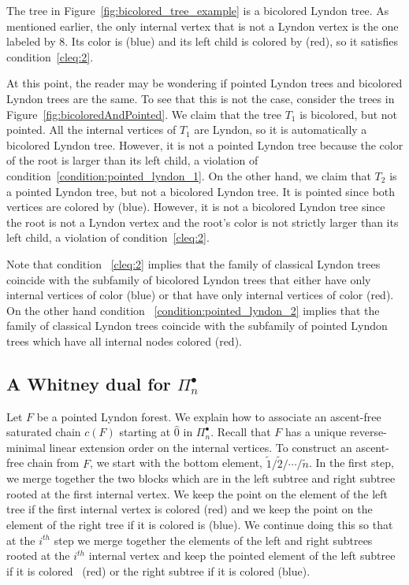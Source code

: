 The tree in Figure~\ref{fig:bicolored_tree_example} is a bicolored Lyndon tree.  As mentioned earlier, the only internal vertex that is not a Lyndon vertex is the one labeled by 8.   Its color is  (blue) and its left child is colored by  (red), so it satisfies condition~\eqref{cleq:2}.  

At this point, the reader may be wondering if pointed Lyndon trees and bicolored Lyndon trees are the same.  To see that this is not the case, consider the trees in Figure~\ref{fig:bicoloredAndPointed}.  We claim that the tree $T_1$ is bicolored, but not pointed.  All the internal vertices of $T_1$ are Lyndon, so it is automatically a bicolored Lyndon tree.  However,  it is not a pointed Lyndon tree because the color of the root is larger than its left child, a violation of condition~\eqref{condition:pointed_lyndon_1}.  On the other hand, we claim that $T_2$ is a pointed Lyndon tree, but not a bicolored Lyndon tree.  It is pointed  since both vertices are colored by  (blue).   However, it is not a bicolored Lyndon tree since the root is not a Lyndon vertex and the root's color is not strictly larger than its left child, a violation of condition~\eqref{cleq:2}.

\begin{rema} Note that condition ~\eqref{cleq:2} implies that the family of  classical Lyndon trees coincide with the subfamily of bicolored Lyndon trees that either have only internal vertices of color  (blue) or that have only internal vertices of color  (red).  On the other hand condition ~\eqref{condition:pointed_lyndon_2} implies that the family of classical Lyndon trees coincide with the subfamily of pointed Lyndon trees which have all internal nodes colored  (red).
\end{rema}

\subsection{A Whitney dual for \texorpdfstring{$\Pi_n^\bullet$}-} \label{subsection:whitney_dual_pointed}

 Let $F$ be a pointed Lyndon forest.  We explain how to associate an ascent-free saturated chain $c(F)$ starting at $\hat{0}$ in $\Pi_n^\bullet$.  Recall that $F$ has a unique reverse-minimal linear extension order on the internal vertices.  To construct an ascent-free chain from $F$, we start with the   bottom element, $\tilde{1}/\tilde{2}/\cdots /\tilde{n}$.  In the first step, we merge together the two blocks which are  in the left subtree and right subtree rooted at the first internal vertex.   We keep the point on the element of the left tree if the first internal vertex is colored  (red) and we keep the point on the element of the right tree if it is  colored is  (blue).   We continue doing this so that at the $i^{th}$ step we merge together the elements of the left and right subtrees rooted at the $i^{th}$ internal vertex and keep the pointed element of the left subtree if it is colored~ (red) or the right subtree if it is colored  (blue). 

